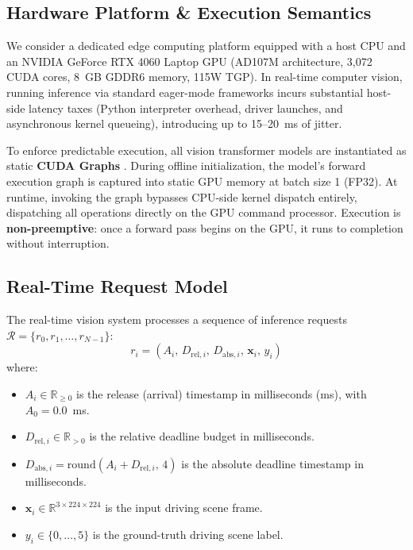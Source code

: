 \documentclass[conference]{IEEEtran}
\begin{document}
\subsection{Hardware Platform \& Execution Semantics}
We consider a dedicated edge computing platform equipped with a host CPU and an NVIDIA GeForce RTX 4060 Laptop GPU (AD107M architecture, 3,072 CUDA cores, 8~GB GDDR6 memory, 115W TGP). In real-time computer vision, running inference via standard eager-mode frameworks incurs substantial host-side latency taxes (Python interpreter overhead, driver launches, and asynchronous kernel queueing), introducing up to 15--20~ms of jitter.

To enforce predictable execution, all vision transformer models are instantiated as static \textbf{CUDA Graphs} \cite{nvidia2023cudagraphs}. During offline initialization, the model's forward execution graph is captured into static GPU memory at batch size 1 (FP32). At runtime, invoking the graph bypasses CPU-side kernel dispatch entirely, dispatching all operations directly on the GPU command processor. Execution is \textbf{non-preemptive}: once a forward pass begins on the GPU, it runs to completion without interruption.

\subsection{Real-Time Request Model}
The real-time vision system processes a sequence of inference requests $\mathcal{R} = \{r_0, r_1, \dots, r_{N-1}\}$:
\begin{equation}
r_i = (A_i, \, D_{\text{rel}, i}, \, D_{\text{abs}, i}, \, \mathbf{x}_i, \, y_i)
\end{equation}
where:
\begin{itemize}
    \item $A_i \in \mathbb{R}_{\ge 0}$ is the release (arrival) timestamp in milliseconds (ms), with $A_0 = 0.0$~ms.
    \item $D_{\text{rel}, i} \in \mathbb{R}_{> 0}$ is the relative deadline budget in milliseconds.
    \item $D_{\text{abs}, i} = \text{round}(A_i + D_{\text{rel}, i}, \, 4)$ is the absolute deadline timestamp in milliseconds.
    \item $\mathbf{x}_i \in \mathbb{R}^{3 \times 224 \times 224}$ is the input driving scene frame.
    \item $y_i \in \{0, \dots, 5\}$ is the ground-truth driving scene label.
\end{itemize}
\end{document}

